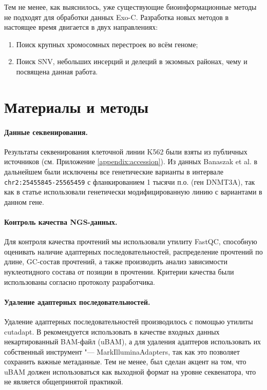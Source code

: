 \documentclass[a4paper,12pt]{article}
\begin{document}
Тем не менее, как выяснилось, уже существующие биоинформационные методы не подходят для обработки данных Exo-C.
Разработка новых методов в настоящее время двигается в двух направлениях:

\begin{enumerate}
\item Поиск крупных хромосомных перестроек во всём геноме\cite{Mozheiko_2019};
\item Поиск SNV, небольших инсерций и делеций в экзомных районах, чему и посвящена данная работа.
\end{enumerate}

\section{Материалы и методы}

\paragraph{Данные секвенирования.}
Результаты секвенирования клеточной линии K562 были взяты из публичных источников (см. Приложение \ref{appendix:accession}).
Из данных Banaszak et al. в дальнейшем были исключены все генетические варианты в интервале \verb|chr2:25455845-25565459| с фланкированием 1 тысячи п.о. (ген DNMT3A), так как в статье использовали генетически модифицированную линию с вариантами в данном гене.

\paragraph{Контроль качества NGS-данных.}
Для контроля качества прочтений мы использовали утилиту FastQC\cite{fastqc}, способную оценивать наличие адаптерных последовательностей, распределение прочтений по длине, GC-состав прочтений, а также производить анализ зависимости нуклеотидного состава от позиции в прочтении.
Критерии качества были использованы согласно протоколу разработчика\cite{fastqc}.

\paragraph{Удаление адаптерных последовательностей.}
Удаление адаптерных последовательностей производилось с помощью утилиты cutadapt\cite{Martin_2011}.
В \cite{Auwera_2013} рекомендуется использовать в качестве входных данных некартированный BAM-файл (uBAM), а для удаления адаптеров использовать их собственный инструмент "--- MarkIlluminaAdapters, так как это позволяет сохранить важные метаданные.
Тем не менее, был сделан акцент на том, что uBAM должен использоваться как выходной формат на уровне секвенатора, что не является общепринятой практикой.
\end{document}

